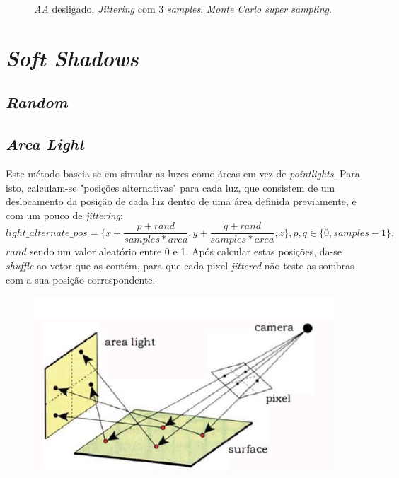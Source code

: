 \documentclass{article}
\begin{document}
\begin{figure}[h]
            \caption{\textit{AA} desligado, \textit{Jittering} com 3 \textit{samples}, \textit{Monte Carlo super sampling}.}
        \end{figure}    

    \section*{\textit{Soft Shadows}}
        \subsection*{\textit{Random}}
            \par

        \subsection*{\textit{Area Light}}
            \par
            Este método baseia-se em simular as luzes como áreas em vez de \textit{pointlights}. Para isto, calculam-se "posições alternativas" para cada luz, que consistem de um deslocamento da posição de cada luz dentro de uma área definida previamente, e com um pouco de \textit{jittering}:
            $$ light\_alternate\_pos = \{x + \frac{p + rand}{samples * area}, y + \frac{q + rand}{samples * area}, z\}, p,q \in \{0, samples - 1\},$$
            $rand$ sendo um valor aleatório entre 0 e 1. Após calcular estas posições, da-se \textit{shuffle} ao vetor que as contém, para que cada pixel \textit{jittered} não teste as sombras com a sua posição correspondente:
            \begin{figure}[h]
                \centering
                \includegraphics[scale=0.5]{area} 
            \end{figure}
\end{document}
